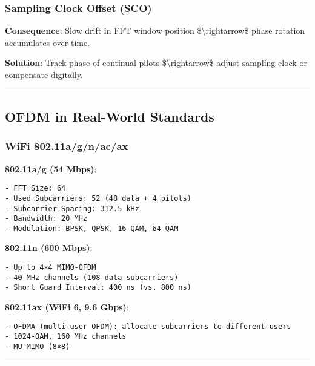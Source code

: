 \subsubsection{Sampling Clock Offset
(SCO)}\label{sampling-clock-offset-sco}

\textbf{Consequence}: Slow drift in FFT window position
\$\textbackslash rightarrow\$ phase rotation accumulates over time.

\textbf{Solution}: Track phase of continual pilots
\$\textbackslash rightarrow\$ adjust sampling clock or compensate
digitally.

\begin{center}\rule{0.5\linewidth}{0.5pt}\end{center}

\subsection{\texorpdfstring{ OFDM in Real-World
Standards}{ OFDM in Real-World Standards}}\label{ofdm-in-real-world-standards}

\subsubsection{WiFi 802.11a/g/n/ac/ax}\label{wifi-802.11agnacax}

\textbf{802.11a/g (54 Mbps)}:

\begin{verbatim}
- FFT Size: 64
- Used Subcarriers: 52 (48 data + 4 pilots)
- Subcarrier Spacing: 312.5 kHz
- Bandwidth: 20 MHz
- Modulation: BPSK, QPSK, 16-QAM, 64-QAM
\end{verbatim}

\textbf{802.11n (600 Mbps)}:

\begin{verbatim}
- Up to 4×4 MIMO-OFDM
- 40 MHz channels (108 data subcarriers)
- Short Guard Interval: 400 ns (vs. 800 ns)
\end{verbatim}

\textbf{802.11ax (WiFi 6, 9.6 Gbps)}:

\begin{verbatim}
- OFDMA (multi-user OFDM): allocate subcarriers to different users
- 1024-QAM, 160 MHz channels
- MU-MIMO (8×8)
\end{verbatim}

\begin{center}\rule{0.5\linewidth}{0.5pt}\end{center}

